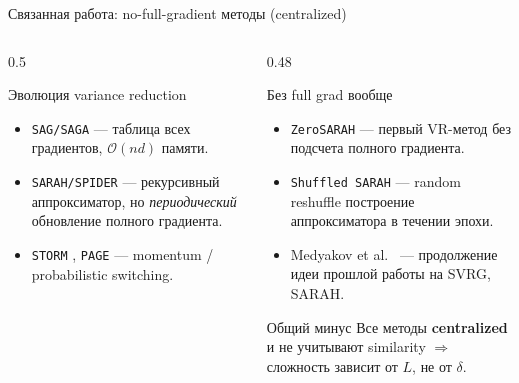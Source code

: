 \documentclass[10pt,aspectratio=169,t]{beamer}
\begin{document}
\begin{frame}{Связанная работа: no-full-gradient методы (centralized)}
\begin{columns}[T,onlytextwidth]
\begin{column}{0.5\textwidth}
\begin{block}{Эволюция variance reduction}
\begin{itemize}
  \item \texttt{SAG/SAGA} \citep{roux2012stochastic,defazio2014saga} — таблица всех градиентов, $\mathcal{O}(nd)$ памяти.
  \item \texttt{SARAH/SPIDER} \citep{nguyen2017sarah,fang2018spider} — рекурсивный аппроксиматор, но \emph{периодический} обновление полного градиента.
  \item \texttt{STORM} \citep{cutkosky2020momentumbasedvariancereductionnonconvex}, \texttt{PAGE} \citep{li2021page} — momentum / probabilistic switching.
\end{itemize}
\end{block}
\end{column}

\begin{column}{0.48\textwidth}
\begin{block}{Без full grad вообще}
\begin{itemize}
  \item \texttt{ZeroSARAH} \citep{li2021zerosarah} — первый VR-метод без подсчета полного градиента.
  \item \texttt{Shuffled SARAH} \citep{beznosikov2024random} — random reshuffle построение аппроксиматора в течении эпохи.
  \item Medyakov et al.~\cite{medyakov2025variance} — продолжение идеи прошлой работы на SVRG, SARAH.
\end{itemize}
\end{block}

\vspace{2mm}
\begin{alertblock}{Общий минус}
Все методы \textbf{centralized} и не учитывают similarity $\Rightarrow$ сложность зависит от $L$, не от $\delta$.
\end{alertblock}
\end{column}
\end{columns}
\end{frame}
\end{document}
